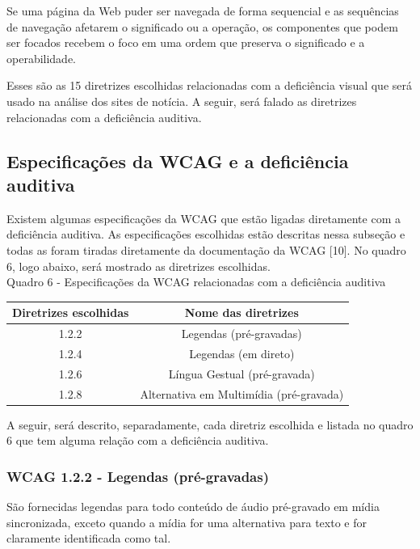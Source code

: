 \documentclass[a4paper]{article}
\begin{document}
\begin{titlepage}
Se uma página da Web puder ser navegada de forma sequencial e as sequências de navegação afetarem o significado ou a operação, os componentes que podem ser focados recebem o foco em uma ordem que preserva o significado e a operabilidade.

Esses são as 15 diretrizes escolhidas relacionadas com a deficiência visual que será usado na análise dos sites de notícia. A seguir, será falado as diretrizes relacionadas com a deficiência auditiva.

\subsection{Especificações da WCAG e a deficiência auditiva}

Existem algumas especificações  da WCAG que estão ligadas diretamente com a deficiência auditiva. As especificações escolhidas estão descritas nessa subseção e todas as foram tiradas diretamente da documentação da WCAG [10]. No quadro 6, logo abaixo, será mostrado as diretrizes escolhidas.\\

Quadro 6 - Especificações da WCAG relacionadas com a deficiência auditiva\\[-1cm]
\begin{center}
	\begin{longtable}{|c|c|}
		\hline
		Diretrizes escolhidas & Nome das diretrizes\\
		\hline
		1.2.2 & Legendas (pré-gravadas)\\
		\hline
		1.2.4 & Legendas (em direto)\\
		\hline
		1.2.6 & Língua Gestual (pré-gravada)\\
		\hline
		1.2.8 & Alternativa em Multimídia (pré-gravada)\\
		\hline
	\end{longtable}
\end{center}

A seguir, será descrito, separadamente, cada diretriz escolhida e listada no quadro 6 que tem alguma relação com a deficiência auditiva.

\subsubsection{WCAG 1.2.2 - Legendas (pré-gravadas)}

São fornecidas legendas para todo conteúdo de áudio pré-gravado em mídia sincronizada, exceto quando a mídia for uma alternativa para texto e for claramente identificada como tal.


\end{titlepage}
\end{document}

